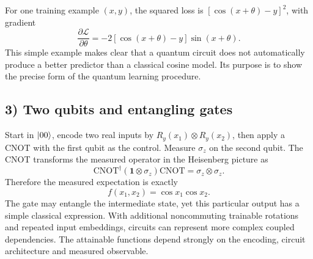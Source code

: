 For one training example $(x,y)$, the squared loss is $[\cos(x+\theta)-y]^2$, with gradient
\begin{equation}
\frac{\partial\mathcal L}{\partial\theta}=-2[\cos(x+\theta)-y]\sin(x+\theta).
\end{equation}
This simple example makes clear that a quantum circuit does not automatically produce a better predictor than a classical cosine model. Its purpose is to show the precise form of the quantum learning procedure.



\subsection*{3) Two qubits and entangling gates}
Start in $\left|00\right\rangle$, encode two real inputs by $R_y(x_1)\otimes R_y(x_2)$, then apply a CNOT with the first qubit as the control. Measure $\sigma_z$ on the second qubit. The CNOT transforms the measured operator in the Heisenberg picture as
\begin{equation}
\mathrm{CNOT}^\dagger(\mathbf1\otimes\sigma_z)\mathrm{CNOT}
=\sigma_z\otimes\sigma_z.
\end{equation}
Therefore the measured expectation is exactly
\begin{equation}\label{eq:qnn-two-qubit}
\boxed{f(x_1,x_2)=\cos x_1\cos x_2.}
\end{equation}
The gate may entangle the intermediate state, yet this particular output has a simple classical expression. With additional noncommuting trainable rotations and repeated input embeddings, circuits can represent more complex coupled dependencies. The attainable functions depend strongly on the encoding, circuit architecture and measured observable.